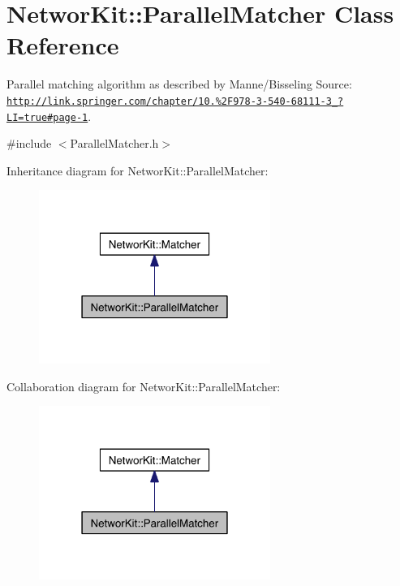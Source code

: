 \hypertarget{class_networ_kit_1_1_parallel_matcher}{\section{Networ\-Kit\-:\-:Parallel\-Matcher Class Reference}
\label{class_networ_kit_1_1_parallel_matcher}
}


Parallel matching algorithm as described by Manne/\-Bisseling Source\-: \href{http://link.springer.com/chapter/10.1007%2F978-3-540-68111-3_74?LI=true#page-1}{\tt http\-://link.\-springer.\-com/chapter/10.\-1007\%2\-F978-\/3-\/540-\/68111-\/3\-\_\-74?\-L\-I=true\#page-\/1}.  




{\ttfamily \#include $<$Parallel\-Matcher.\-h$>$}



Inheritance diagram for Networ\-Kit\-:\-:Parallel\-Matcher\-:\nopagebreak
\begin{figure}[H]
\begin{center}
\leavevmode
\includegraphics[width=214pt]{class_networ_kit_1_1_parallel_matcher__inherit__graph}
\end{center}
\end{figure}


Collaboration diagram for Networ\-Kit\-:\-:Parallel\-Matcher\-:\nopagebreak
\begin{figure}[H]
\begin{center}
\leavevmode
\includegraphics[width=214pt]{class_networ_kit_1_1_parallel_matcher__coll__graph}
\end{center}
\end{figure}
